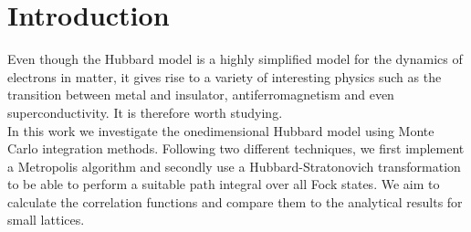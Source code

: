      
\section{Introduction}
Even though the Hubbard model is a highly simplified model for the dynamics of electrons in matter, it gives rise to a variety of interesting physics such as the transition between metal and insulator, antiferromagnetism and even superconductivity. It is therefore worth studying.\\
In this work we investigate the onedimensional Hubbard model using Monte Carlo integration methods. Following two different techniques, we first implement a Metropolis algorithm and secondly use a Hubbard-Stratonovich transformation \cite{luu} to be able to perform a suitable path integral over all Fock states. We aim to calculate the correlation functions and compare them to the analytical results for small lattices. 
